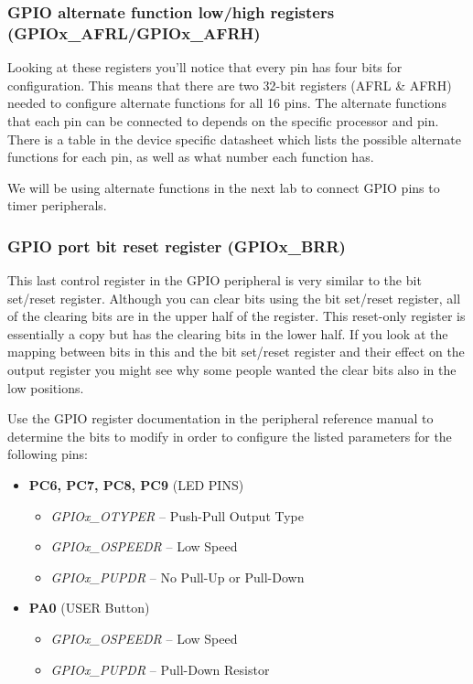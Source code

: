 \documentclass[11pt,fleqn]{book} %
\begin{document}
\subsubsection{GPIO alternate function low/high registers (GPIOx\_AFRL/GPIOx\_AFRH)}
Looking at these registers you'll notice that every pin has four bits for configuration. This means that there are two 32-bit registers (AFRL \& AFRH) needed to configure alternate functions for all 16 pins. The alternate functions that each pin can be connected to depends on the specific processor and pin. There is a table in the device specific datasheet which lists the possible alternate functions for each pin, as well as what number each function has.

We will be using alternate functions in the next lab to connect GPIO pins to timer peripherals.

\subsubsection{GPIO port bit reset register (GPIOx\_BRR)}
This last control register in the GPIO peripheral is very similar to the bit set/reset register. Although you can clear bits using the bit set/reset register, all of the clearing bits are in the upper half of the register. This reset-only register is essentially a copy but has the clearing bits in the lower half. If you look at the mapping between bits in this and the bit set/reset register and their effect on the output register you might see why some people wanted the clear bits also in the low positions.

\begin{exercise}
    
   Use the GPIO register documentation in the peripheral reference manual to determine the bits to modify in order to configure the listed parameters for the following pins:
    
    \begin{itemize}
        \item \textbf{PC6, PC7, PC8, PC9} (LED PINS) 
        \begin{itemize}
            \item \textit{GPIOx\_OTYPER} -- Push-Pull Output Type
            \item \textit{GPIOx\_OSPEEDR} -- Low Speed
            \item \textit{GPIOx\_PUPDR} -- No Pull-Up or Pull-Down
        \end{itemize}
        \item \textbf{PA0} (USER Button)
        \begin{itemize}
            \item \textit{GPIOx\_OSPEEDR} -- Low Speed
            \item \textit{GPIOx\_PUPDR} -- Pull-Down Resistor
        \end{itemize}
    \end{itemize}
\end{exercise}
\end{document}
